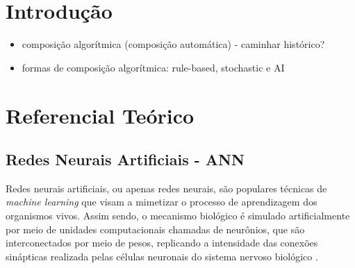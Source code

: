 \documentclass{automatextcc}
\begin{document}
\listoftables




\chapter{Introdução}

\begin{itemize}
    \item composição algorítmica (composição automática) - caminhar histórico?
    \item formas de composição algorítmica: rule-based, stochastic e AI
\end{itemize}





\chapter{Referencial Teórico}


\section{Redes Neurais Artificiais - ANN}

Redes neurais artificiais, ou apenas redes neurais, são populares técnicas de \textit{machine learning} que visam a mimetizar o processo de aprendizagem dos organismos vivos. Assim sendo, o mecanismo biológico é simulado artificialmente por meio de unidades computacionais chamadas de neurônios, que são interconectados por meio de pesos, replicando a intensidade das conexões sinápticas realizada pelas células neuronais do sistema nervoso biológico \citep{aggarwal2018DeepLearning}.
\end{document}
